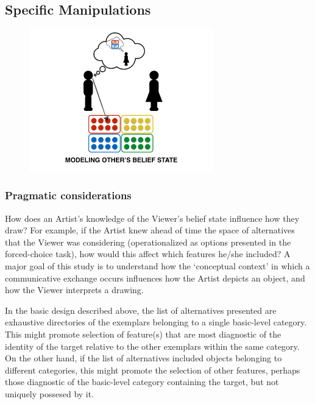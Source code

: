 \documentclass[12pt]{article}
\begin{document}
\subsection{Specific Manipulations}

\begin{figure}[hbtp]
\begin{center}
\includegraphics[width=80mm]{figures/pragmatic_considerations.pdf}
\end{center}
\end{figure}
\vspace{-5mm}

\subsubsection{Pragmatic considerations}

How does an Artist's knowledge of the Viewer's belief state influence how they draw? For example, if the Artist knew ahead of time the space of alternatives that the Viewer was considering (operationalized as options presented in the forced-choice task), how would this affect which features he/she included? A major goal of this study is to understand how the `conceptual context' in which a communicative exchange occurs influences how the Artist depicts an object, and how the Viewer interprets a drawing. 

In the basic design described above, the list of alternatives presented are exhaustive directories of the exemplars belonging to a single basic-level category. This might promote selection of feature(s) that are most diagnostic of the identity of the target relative to the other exemplars within the same category. On the other hand, if the list of alternatives included objects belonging to different categories, this might promote the selection of other features, perhaps those diagnostic of the basic-level category containing the target, but not uniquely possesed by it. 
\end{document}
